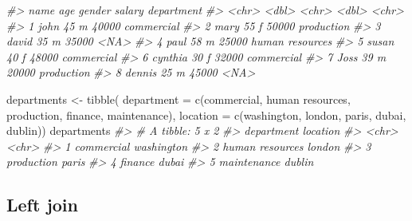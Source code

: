\documentclass[
]{book}
\newenvironment{Shaded}{\begin{snugshade}}{\end{snugshade}}
\newcommand{\AttributeTok}[1]{\textcolor[rgb]{0.77,0.63,0.00}{#1}}
\newcommand{\CommentTok}[1]{\textcolor[rgb]{0.56,0.35,0.01}{\textit{#1}}}
\newcommand{\FunctionTok}[1]{\textcolor[rgb]{0.00,0.00,0.00}{#1}}
\newcommand{\NormalTok}[1]{#1}
\newcommand{\OtherTok}[1]{\textcolor[rgb]{0.56,0.35,0.01}{#1}}
\newcommand{\StringTok}[1]{\textcolor[rgb]{0.31,0.60,0.02}{#1}}
\begin{document}
\begin{Shaded}
\begin{Highlighting}[]
\CommentTok{\#\textgreater{}   name      age gender salary department     }
\CommentTok{\#\textgreater{}   \textless{}chr\textgreater{}   \textless{}dbl\textgreater{} \textless{}chr\textgreater{}   \textless{}dbl\textgreater{} \textless{}chr\textgreater{}          }
\CommentTok{\#\textgreater{} 1 john       45 m       40000 commercial     }
\CommentTok{\#\textgreater{} 2 mary       55 f       50000 production     }
\CommentTok{\#\textgreater{} 3 david      35 m       35000 \textless{}NA\textgreater{}           }
\CommentTok{\#\textgreater{} 4 paul       58 m       25000 human resources}
\CommentTok{\#\textgreater{} 5 susan      40 f       48000 commercial     }
\CommentTok{\#\textgreater{} 6 cynthia    30 f       32000 commercial     }
\CommentTok{\#\textgreater{} 7 Joss       39 m       20000 production     }
\CommentTok{\#\textgreater{} 8 dennis     25 m       45000 \textless{}NA\textgreater{}}

\NormalTok{departments }\OtherTok{\textless{}{-}} \FunctionTok{tibble}\NormalTok{(}
    \AttributeTok{department =} \FunctionTok{c}\NormalTok{(}\StringTok{\textquotesingle{}commercial\textquotesingle{}}\NormalTok{, }\StringTok{\textquotesingle{}human resources\textquotesingle{}}\NormalTok{, }\StringTok{\textquotesingle{}production\textquotesingle{}}\NormalTok{, }\StringTok{\textquotesingle{}finance\textquotesingle{}}\NormalTok{, }\StringTok{\textquotesingle{}maintenance\textquotesingle{}}\NormalTok{),}
    \AttributeTok{location =} \FunctionTok{c}\NormalTok{(}\StringTok{\textquotesingle{}washington\textquotesingle{}}\NormalTok{, }\StringTok{\textquotesingle{}london\textquotesingle{}}\NormalTok{, }\StringTok{\textquotesingle{}paris\textquotesingle{}}\NormalTok{, }\StringTok{\textquotesingle{}dubai\textquotesingle{}}\NormalTok{, }\StringTok{\textquotesingle{}dublin\textquotesingle{}}\NormalTok{))}
\NormalTok{departments}
\CommentTok{\#\textgreater{} \# A tibble: 5 x 2}
\CommentTok{\#\textgreater{}   department      location  }
\CommentTok{\#\textgreater{}   \textless{}chr\textgreater{}           \textless{}chr\textgreater{}     }
\CommentTok{\#\textgreater{} 1 commercial      washington}
\CommentTok{\#\textgreater{} 2 human resources london    }
\CommentTok{\#\textgreater{} 3 production      paris     }
\CommentTok{\#\textgreater{} 4 finance         dubai     }
\CommentTok{\#\textgreater{} 5 maintenance     dublin}
\end{Highlighting}
\end{Shaded}

\hypertarget{left-join-1}{%
\subsection{Left join}\label{left-join-1}}
\end{document}
